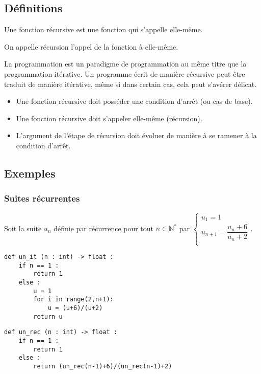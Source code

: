 

\subsection*{Définitions}
\begin{defi}%
Une fonction récursive est une fonction qui s'appelle elle-même.

On appelle récursion l'appel de la fonction à elle-même.
\end{defi}

La programmation est un paradigme de programmation au même titre que la programmation itérative. Un programme écrit de manière récursive peut être traduit de manière itérative, même si dans certain cas, cela peut s'avérer délicat.


\begin{methode}
\begin{itemize}
\item Une fonction récursive doit posséder une condition d'arrêt (ou cas de base).
\item Une fonction récursive doit s'appeler elle-même (récursion).
\item L'argument de l'étape de récursion doit évoluer de manière à se ramener à la condition d'arrêt.
\end{itemize}
\end{methode}
 
 


\subsection*{Exemples}

\subsubsection*{Suites récurrentes}
Soit la suite $u_n$ définie par récurrence pour tout $n\in\mathbb{N}^*$ par 
$
\left\{
\begin{array}{ll} 
u_1 = 1 \\
u_{n+1} = \dfrac{u_n + 6}{u_n + 2} \\
\end{array}
\right.
$.

\noindent\begin{minipage}[c]{.45\linewidth}
\begin{lstlisting}
def un_it (n : int) -> float :
    if n == 1 :
        return 1
    else : 
        u = 1
        for i in range(2,n+1):
            u = (u+6)/(u+2)
        return u
\end{lstlisting}
\end{minipage} \hfill
\begin{minipage}[c]{.45\linewidth}
\begin{lstlisting}
def un_rec (n : int) -> float :
    if n == 1 :
        return 1
    else : 
        return (un_rec(n-1)+6)/(un_rec(n-1)+2)
\end{lstlisting}
\end{minipage} 

